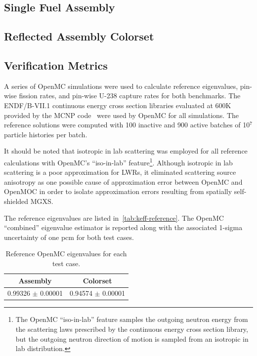 \subsection{Single Fuel Assembly}
\label{subsubsec:benchmarks-assm}

\subsection{Reflected Assembly Colorset}
\label{subsubsec:benchmarks-2x2}



\subsection{Verification Metrics}
\label{subsec:metrics}

A series of OpenMC simulations were used to calculate reference eigenvalues, pin-wise fission rates, and pin-wise U-238 capture rates for both benchmarks. The ENDF/B-VII.1 continuous energy cross section libraries evaluated at 600K provided by the MCNP code~\citep{mcnpx2003manual} were used by OpenMC for all simulations. The reference solutions were computed with 100 inactive and 900 active batches of 10$^7$ particle histories per batch.

It should be noted that isotropic in lab scattering was employed for all reference calculations with OpenMC's ``iso-in-lab'' feature\footnote{The OpenMC ``iso-in-lab'' feature samples the outgoing neutron energy from the scattering laws prescribed by the continuous energy cross section library, but the outgoing neutron direction of motion is sampled from an isotropic in lab distribution.}. Although isotropic in lab scattering is a poor approximation for LWRs, it eliminated scattering source anisotropy as one possible cause of approximation error between OpenMC and OpenMOC in order to isolate approximation errors resulting from spatially self-shielded MGXS.

The reference eigenvalues are listed in~\autoref{tab:keff-reference}. The OpenMC ``combined'' eigenvalue estimator is reported along with the associated 1-sigma uncertainty of one pcm for both test cases.

\begin{table}[h!]
  \centering
  \caption{Reference OpenMC eigenvalues for each test case.}
  \label{tab:keff-reference} 
  \begin{tabular}{c c}
  \toprule
  {\bf Assembly} &
  {\bf Colorset} \\
  \midrule
  0.99326 $\pm$ 0.00001 & 0.94574 $\pm$ 0.00001 \\
  \bottomrule
\end{tabular}
\end{table}

